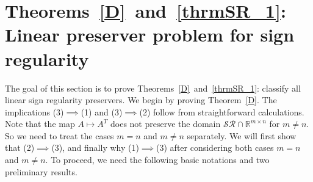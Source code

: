\documentclass[11pt,reqno]{amsart}
\theoremstyle{plain}
\theoremstyle{definition}
\numberwithin{equation}{section}
\begin{document}
\section{Theorems~\ref{D}~and~\ref{thrmSR_1}: Linear preserver problem for sign regularity}\label{section SR}

The goal of this section is to prove Theorems~\ref{D}~and~\ref{thrmSR_1}: classify all linear sign regularity preservers. We begin by proving Theorem~\ref{D}. The implications (3)$\implies$(1) and (3)$\implies$(2) follow from straightforward calculations. Note that the map $A\mapsto A^T$ does not preserve the domain $\mathcal{SR}\cap\mathbb{R}^{m\times n}$ for $m\neq n$. So we need to treat the cases $m=n$ and $m\neq n$ separately. We will first show that (2)$\implies$(3), and finally why (1)$\implies$(3) after considering both cases $m=n$ and $m\neq n$. To proceed, we need the following basic notations and two preliminary results.
\end{document}
